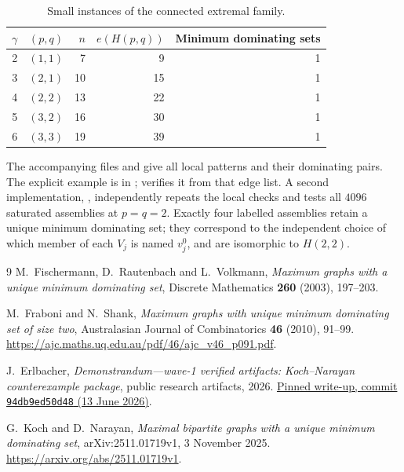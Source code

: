 \documentclass[11pt]{article}
\theoremstyle{definition}
\theoremstyle{remark}
\newcommand{\e}{e}
\begin{document}
\begin{table}[htbp]
\centering
\begin{tabular}{rrrrr}
\toprule
$\gamma$ & $(p,q)$ & $n$ & $\e(H(p,q))$ & Minimum dominating sets\\
\midrule
2 & $(1,1)$ & 7 & 9 & 1\\
3 & $(2,1)$ & 10 & 15 & 1\\
4 & $(2,2)$ & 13 & 22 & 1\\
5 & $(3,2)$ & 16 & 30 & 1\\
6 & $(3,3)$ & 19 & 39 & 1\\
\bottomrule
\end{tabular}
\caption{Small instances of the connected extremal family.}
\label{tab:small}
\end{table}

The accompanying files  and
 give all local patterns and their
dominating pairs. The explicit example is in ;
 verifies it from that edge list.
A second implementation, , independently
repeats the local checks and tests all $4096$ saturated assemblies at $p=q=2$.
Exactly four labelled assemblies retain a unique minimum dominating set;
they correspond to the independent choice of which member of each $V_j$
is named $v_j^0$, and are isomorphic to $H(2,2)$.

\begin{thebibliography}{9}
M.~Fischermann, D.~Rautenbach and L.~Volkmann,
\emph{Maximum graphs with a unique minimum dominating set},
Discrete Mathematics \textbf{260} (2003), 197--203.

M.~Fraboni and N.~Shank,
\emph{Maximum graphs with unique minimum dominating set of size two},
Australasian Journal of Combinatorics \textbf{46} (2010), 91--99.
\url{https://ajc.maths.uq.edu.au/pdf/46/ajc_v46_p091.pdf}.

J.~Erlbacher,
\emph{Demonstrandum---wave-1 verified artifacts: Koch--Narayan counterexample package},
public research artifacts, 2026.
\href{https://github.com/demonstrandum-research/artifacts/blob/94db9ed50d48a57aae5ccb72e6a95a2b8f8f39d3/problems/p2-factory/kills/koch-narayan/WRITEUP.md}{Pinned write-up, commit \texttt{94db9ed50d48} (13 June 2026)}.

G.~Koch and D.~Narayan,
\emph{Maximal bipartite graphs with a unique minimum dominating set},
arXiv:2511.01719v1, 3 November 2025.
\url{https://arxiv.org/abs/2511.01719v1}.
\end{thebibliography}
\end{document}
